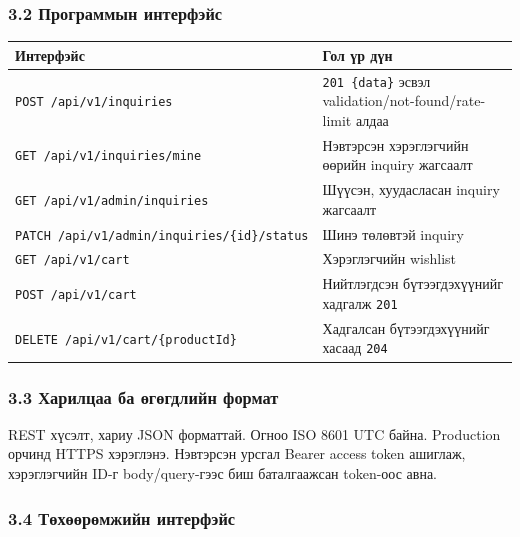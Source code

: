 \documentclass[
  mongolian,
]{article}
\begin{document}
\subsubsection{3.2 Программын
интерфэйс}\label{ux43fux440ux43eux433ux440ux430ux43cux43cux44bux43d-ux438ux43dux442ux435ux440ux444ux44dux439ux441}

\begin{longtable}[]{@{}
  >{\raggedright\arraybackslash}p{}
  >{\raggedright\arraybackslash}p{}@{}}
\toprule\noalign{}
\begin{minipage}[b]{\linewidth}\raggedright
Интерфэйс
\end{minipage} & \begin{minipage}[b]{\linewidth}\raggedright
Гол үр дүн
\end{minipage} \\
\midrule\noalign{}
\endhead
\bottomrule\noalign{}
\endlastfoot
\texttt{POST\ /api/v1/inquiries} & \texttt{201\ \{data\}} эсвэл
validation/not-found/rate-limit алдаа \\
\texttt{GET\ /api/v1/inquiries/mine} & Нэвтэрсэн хэрэглэгчийн өөрийн
inquiry жагсаалт \\
\texttt{GET\ /api/v1/admin/inquiries} & Шүүсэн, хуудасласан inquiry
жагсаалт \\
\texttt{PATCH\ /api/v1/admin/inquiries/\{id\}/status} & Шинэ төлөвтэй
inquiry \\
\texttt{GET\ /api/v1/cart} & Хэрэглэгчийн wishlist \\
\texttt{POST\ /api/v1/cart} & Нийтлэгдсэн бүтээгдэхүүнийг хадгалж
\texttt{201} \\
\texttt{DELETE\ /api/v1/cart/\{productId\}} & Хадгалсан бүтээгдэхүүнийг
хасаад \texttt{204} \\
\end{longtable}

\subsubsection{3.3 Харилцаа ба өгөгдлийн
формат}\label{ux445ux430ux440ux438ux43bux446ux430ux430-ux431ux430-ux4e9ux433ux4e9ux433ux434ux43bux438ux439ux43d-ux444ux43eux440ux43cux430ux442}

REST хүсэлт, хариу JSON форматтай. Огноо ISO 8601 UTC байна. Production
орчинд HTTPS хэрэглэнэ. Нэвтэрсэн урсгал Bearer access token ашиглаж,
хэрэглэгчийн ID-г body/query-гээс биш баталгаажсан token-оос авна.

\subsubsection{3.4 Төхөөрөмжийн
интерфэйс}\label{ux442ux4e9ux445ux4e9ux4e9ux440ux4e9ux43cux436ux438ux439ux43d-ux438ux43dux442ux435ux440ux444ux44dux439ux441}
\end{document}
